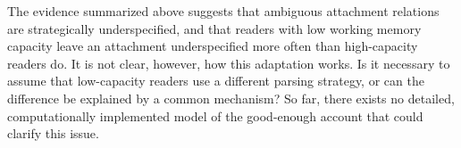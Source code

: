 \documentclass{cambridge7A}\usepackage[]{graphicx}\usepackage[]{color}
\begin{document}





The evidence summarized above suggests that ambiguous attachment relations are strategically underspecified, and that readers with low working memory capacity leave an attachment underspecified more often than high-capacity readers do. 
It is not clear, however, how this adaptation works. Is it necessary to assume that low-capacity readers use a different parsing strategy, or can the difference be explained by a common mechanism? So far, there exists no detailed, computationally implemented model of the good-enough account that could clarify this issue.
\end{document}
